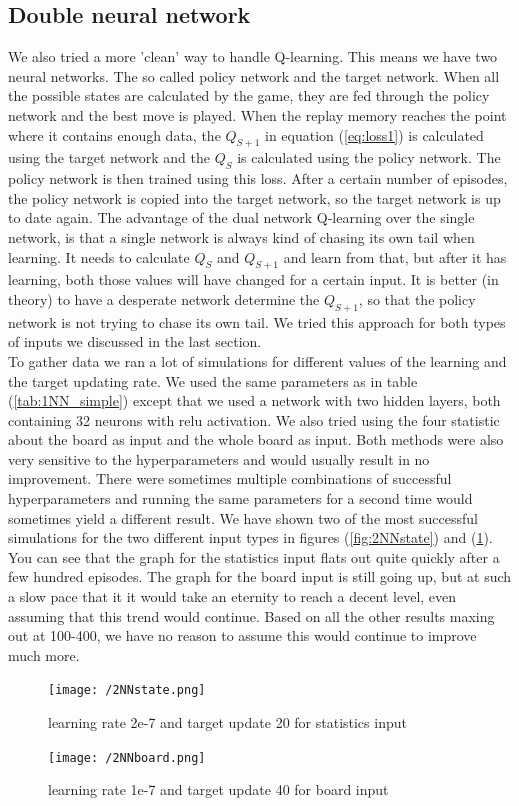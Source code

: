 \documentclass{report}
\begin{document}
\subsection{Double neural network}
We also tried a more 'clean' way to handle Q-learning. This means we have two neural networks. The so called policy network and the target network. When all the possible states are calculated by the game, they are fed through the policy network and the best move is played. When the replay memory reaches the point where it contains enough data, the $Q_{S+1}$ in equation (\ref{eq:loss1}) is calculated using the target network and the $Q_S$ is calculated using the policy network. The policy network is then trained using this loss. After a certain number of episodes, the policy network is copied into the target network, so the target network is up to date again. The advantage of the dual network Q-learning over the single network, is that a single network is always kind of chasing its own tail when learning. It needs to calculate $Q_S$ and $Q_{S+1}$ and learn from that, but after it has learning, both those values will have changed for a certain input. It is better (in theory) to have a desperate network determine the $Q_{S+1}$, so that the policy network is not trying to chase its own tail.
We tried this approach for both types of inputs we discussed in the last section.\\
To gather data we ran a lot of simulations for different values of the learning and the target updating rate. We used the same parameters as in table (\ref{tab:1NN_simple}) except that we used a network with two hidden layers, both containing 32 neurons with relu activation. We also tried using the four statistic about the board as input and the whole board as input. Both methods were also very sensitive to the hyperparameters and would usually result in no improvement. There were sometimes multiple combinations of successful hyperparameters and running the same parameters for a second time would sometimes yield a different result. We have shown two of the most successful simulations for the two different input types in figures (\ref{fig:2NNstate}) and (\ref{fig:2NNboard}). You can see that the graph for the statistics input flats out quite quickly after a few hundred episodes. The graph for the board input is still going up, but at such a slow pace that it it would take an eternity to reach a decent level, even assuming that this trend would continue. Based on all the other results maxing out at 100-400, we have no reason to assume this would continue to improve much more. 
\begin{figure}[h]
	\centering
	\begin{minipage}[b]{0.45\textwidth}
   		\texttt{[image: /2NNstate.png]}
    	\caption{learning rate 2e-7 and target update 20 for statistics input}
    	\label{fig:2NNstate}
 	\end{minipage}
  	\begin{minipage}[b]{0.45\textwidth}
    	\texttt{[image: /2NNboard.png]}
    	\caption{learning rate 1e-7 and target update 40 for board input}
    	\label{fig:2NNboard}
 	\end{minipage}
\end{figure}
\end{document}
